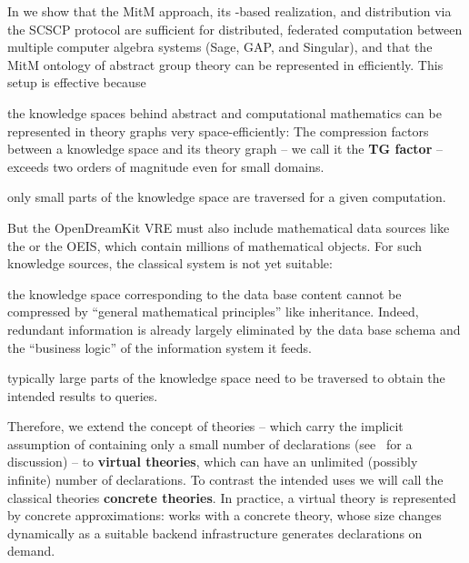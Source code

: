 In \cite{KohMuePfe:kbimss17} we show that the MitM approach, its \ommt-based realization,
and distribution via the SCSCP protocol are sufficient for distributed, federated computation
between multiple computer algebra systems (Sage, GAP, and Singular), and that the MitM
ontology of abstract group theory can be represented in \ommt efficiently. This setup is
effective because
\begin{compactitem}
\item the knowledge spaces behind abstract and computational mathematics can be
  represented in theory graphs very space-efficiently: The compression factors between a
  knowledge space and its theory graph -- we call it the \textbf{TG factor} --
  exceeds two orders of magnitude even for small domains.
\item only small parts of the knowledge space are traversed for a given computation. 
\end{compactitem}

But the \textsf{OpenDreamKit} VRE must also include mathematical data sources like the \lmfdb or
the OEIS, which contain millions of mathematical objects. For such knowledge sources, the
classical \mmt system is not yet suitable: 
\begin{compactitem}
\item the knowledge space corresponding to the data base content cannot be compressed by
  ``general mathematical principles'' like inheritance. Indeed, redundant information is
  already largely eliminated by the data base schema and the ``business logic'' of the
  information system it feeds.
\item typically large parts of the knowledge space need to be traversed to obtain the
  intended results to queries.
\end{compactitem}
Therefore, we extend the concept of \ommt theories -- which carry the implicit
assumption of containing only a small number of declarations (see~\cite{FaGu:lt92} for a
discussion) -- to \textbf{virtual theories}, which can have an unlimited (possibly infinite) number of
declarations.
To contrast the intended
uses we will call the classical \ommt theories \textbf{concrete theories}. 
In practice, a virtual theory is represented by concrete approximations: \ommt works with a concrete theory, whose size changes dynamically as a suitable backend infrastructure generates declarations on demand.


